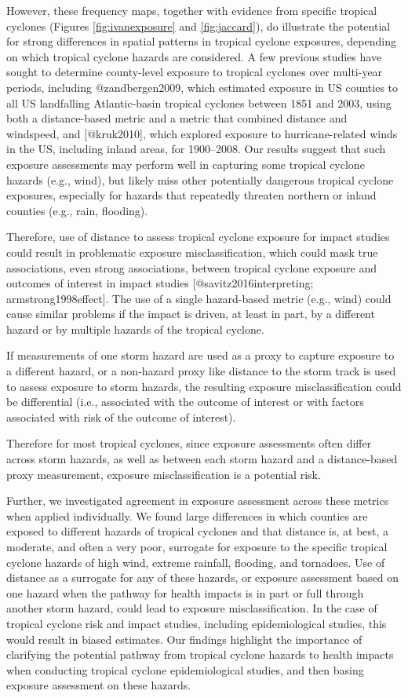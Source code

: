 However, these frequency maps, together with evidence from
specific tropical cyclones (Figures \ref{fig:ivanexposure}
and \ref{fig:jaccard}),  do illustrate the potential for strong differences in
spatial patterns in tropical cyclone exposures, depending on which tropical
cyclone hazards are considered.  A few previous studies have sought to
determine county-level exposure to tropical cyclones over multi-year periods,
including @zandbergen2009, which estimated exposure in US
counties to all US landfalling Atlantic-basin tropical cyclones
between 1851 and 2003, using both a distance-based metric and a metric that
combined distance and windspeed, and [@kruk2010], which explored
exposure to hurricane-related winds in the US, including inland areas,
for 1900--2008.  Our results suggest that such exposure assessments may
perform well in capturing some tropical cyclone hazards (e.g., wind), but
likely miss other potentially dangerous tropical cyclone exposures, especially
for hazards that repeatedly threaten northern or inland counties (e.g., rain,
flooding).

Therefore, use of distance to assess tropical cyclone exposure for impact
studies could result in problematic exposure misclassification, which could mask
true associations, even strong associations, between tropical cyclone exposure
and outcomes of interest in impact studies [@savitz2016interpreting;
armstrong1998effect]. The use of a single hazard-based metric (e.g., wind) could
cause similar problems if the impact is driven, at least in part, by a different
hazard or by multiple hazards of the tropical cyclone.

If measurements of one storm hazard are used as a proxy to capture exposure to
a different hazard, or a non-hazard proxy like distance to the storm track is
used to assess exposure to storm hazards, the resulting exposure
misclassification could be differential (i.e., associated with the outcome of
interest or with factors associated with risk of the outcome of interest). 

Therefore for most tropical cyclones, since exposure assessments often differ
across storm hazards, as well as between each storm hazard and a distance-based
proxy measurement, exposure misclassification is a potential risk.

Further, we investigated agreement in exposure assessment across these metrics
when applied individually. We found large differences in which counties are
exposed to different hazards of tropical cyclones and that distance is, at
best, a moderate, and often a very poor, surrogate for exposure to the specific
tropical cyclone hazards of high wind, extreme rainfall, flooding, and
tornadoes. Use of distance as a surrogate for any of these hazards, or exposure
assessment based on one hazard when the pathway for health impacts is in part
or full through another storm hazard, could lead to exposure misclassification.
In the case of tropical cyclone risk and impact studies, including
epidemiological studies, this would result in biased estimates.  Our findings
highlight the importance of clarifying the potential pathway from tropical
cyclone hazards to health impacts when conducting tropical cyclone
epidemiological studies, and then basing exposure assessment on these hazards.

